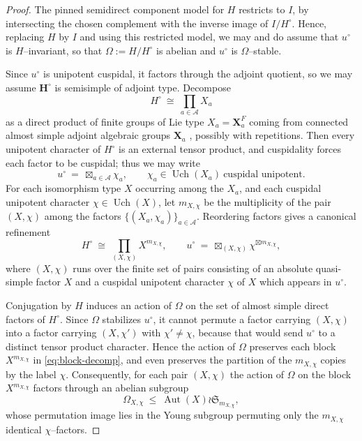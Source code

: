 \documentclass{amsart}
\theoremstyle{plain}
\numberwithin{equation}{section}
\theoremstyle{definition}
\newcommand{\Uch}{\operatorname{Uch}}
\newcommand{\Aut}{\operatorname{Aut}}
\begin{document}
\begin{proof}
The pinned semidirect component model for $H$ restricts to $I$, by intersecting the chosen
complement with the inverse image of $I/H^\circ$.  Hence, replacing $H$ by $I$ and using this
restricted model, we may and do assume that $u^\circ$ is $H$--invariant, so that
$\Omega:=H/H^\circ$ is abelian and $u^\circ$ is $\Omega$--stable.

\medskip
Since $u^\circ$ is unipotent cuspidal, it factors through the adjoint quotient, so we may assume
$\mathbf H^\circ$ is semisimple of adjoint type.  Decompose
\[
H^\circ \ \cong\ \prod_{a\in\mathcal A} X_a
\]
as a direct product of finite groups of Lie type $X_a=\mathbf X_a^F$ coming from connected almost
simple adjoint algebraic groups $\mathbf X_a$ , possibly with repetitions.
Then every unipotent character of $H^\circ$ is an external tensor product, and cuspidality forces
each factor to be cuspidal; thus we may write
\[
u^\circ \ =\ \boxtimes_{a\in\mathcal A}\chi_a,
\qquad \chi_a\in\Uch(X_a)\ \text{cuspidal unipotent.}
\]
For each isomorphism type $X$ occurring among the $X_a$, and each cuspidal unipotent character
$\chi\in\Uch(X)$, let $m_{X,\chi}$ be the multiplicity of the pair $(X,\chi)$ among the factors
$\{(X_a,\chi_a)\}_{a\in\mathcal A}$.  Reordering factors gives a canonical refinement
\begin{equation}\label{eq:block-decomp}
H^\circ \ \cong\ \prod_{(X,\chi)} X^{m_{X,\chi}},
\qquad
u^\circ \ =\ \boxtimes_{(X,\chi)} \chi^{\boxtimes m_{X,\chi}},
\end{equation}
where $(X,\chi)$ runs over the finite set of pairs consisting of an absolute quasi-simple factor $X$ and a
cuspidal unipotent character $\chi$ of $X$ which appears in $u^\circ$.

\medskip

Conjugation by $H$ induces an action of $\Omega$ on the set of almost simple direct factors of
$H^\circ$.  Since $\Omega$ stabilizes $u^\circ$, it cannot permute a factor carrying $(X,\chi)$ into
a factor carrying $(X,\chi')$ with $\chi'\neq\chi$, because that would send $u^\circ$ to a distinct
tensor product character.  Hence the action of $\Omega$ preserves each block $X^{m_{X,\chi}}$ in
\eqref{eq:block-decomp}, and even preserves the partition of the $m_{X,\chi}$ copies by the label
$\chi$.  Consequently, for each pair $(X,\chi)$ the action of $\Omega$ on the block
$X^{m_{X,\chi}}$ factors through an abelian subgroup
\[
\Omega_{X,\chi}\ \le\ \Aut(X)\wr \mathfrak S_{m_{X,\chi}},
\]
whose permutation image lies in the Young subgroup permuting only the $m_{X,\chi}$ identical
$\chi$--factors.


\end{proof}
\end{document}

